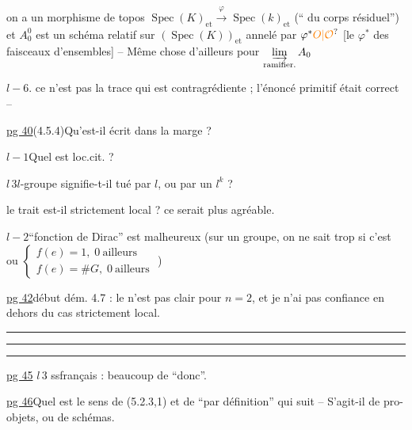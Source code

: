  on a un morphisme de topos $\operatorname{Spec}(K)_{\mathrm{et}}\xrightarrow{\varphi}\operatorname{Spec}(k)_{\mathrm{et}}$ (`` du corps résiduel'') et $A_0^0$ est un schéma relatif sur $(\operatorname{Spec}(K))_{\mathrm{et}}$ annelé par $\varphi^*\unsure{O|\mathcal O}$ [le $\varphi^*$ des faisceaux d'ensembles] -- Même chose d'ailleurs pour $\underset{\text{ramifier.}}{\varinjlim}\, A_0$

\quad $l-6$.\qquad {} ce n'est pas la trace qui est contragrédiente ; l'énoncé primitif était correct --

\uline{pg 40}\qquad (4.5.4)\quad Qu'est-il écrit dans la marge ?

$l-1$\qquad Quel est loc.cit. ?

$l\,3$\qquad $l$-groupe signifie-t-il tué par $l$, ou par un $l^k$ ?

le trait est-il strictement local ? ce serait plus agréable.


\quad $l-2$\qquad ``fonction de Dirac'' est malheureux (sur un groupe, on ne sait trop si c'est \quad ou $\left\{\begin{array}{l}f(e)=1,\;0\ \text{ailleurs}\\f(e)=\#G,\;0\ \text{ailleurs}\end{array}\right.$ )


\uline{pg 42}\quad début dém. 4.7 : le  n'est pas clair pour $n=2$, et je n'ai pas confiance en dehors du cas strictement local.

\hrule\smallskip\hrule\smallskip\hrule


\uline{pg 45} $l\,3$ ss\quad français : beaucoup de ``donc''.

\uline{pg 46}\quad Quel est le sens de (5.2.3,1) et de  ``par définition'' qui suit -- S'agit-il de pro-objets, ou de schémas.


